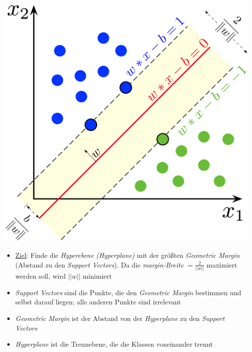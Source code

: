\begin{minipage}{0.4\textwidth}
    \includegraphics[width=\linewidth]{optimierung/SVM_margin.png}
\end{minipage}
\hfill
\begin{minipage}{0.5\textwidth}
    \begin{itemize}
        \item \underline{Ziel}: Finde die \emph{Hyperebene (Hyperplane)} mit der größten \emph{Geometric Margin} (Abstand zu den \emph{Support Vectors}). Da die \emph{margin-Breite} \(=\frac{2}{||w||}\) maximiert werden soll, wird \(||w||\) minimiert
        \item \emph{Support Vectors} sind die Punkte, die den \emph{Geometric Margin} bestimmen und selbst darauf liegen; alle anderen Punkte sind irrelevant
        \item \emph{Geometric Margin} ist der Abstand von der \emph{Hyperplane} zu den \emph{Support Vectors}
        \item \emph{Hyperplane} ist die Trennebene, die die Klassen voneinander trennt
    \end{itemize}
\end{minipage}
